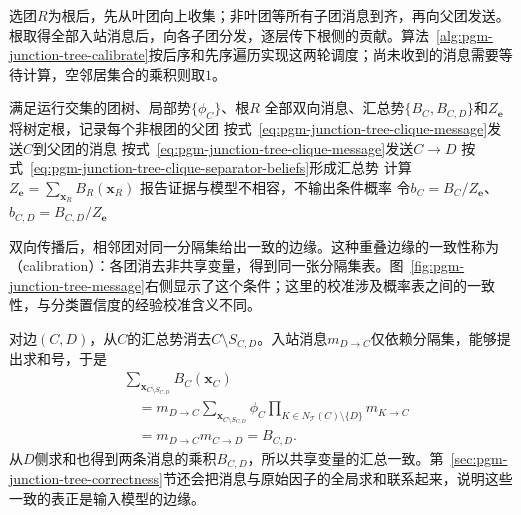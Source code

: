 选团$R$为根后，先从叶团向上收集；非叶团等所有子团消息到齐，再向父团发送。根取得全部入站消息后，向各子团分发，逐层传下根侧的贡献。算法~\ref{alg:pgm-junction-tree-calibrate}按后序和先序遍历实现这两轮调度；尚未收到的消息需要等待计算，空邻居集合的乘积则取$1$。

\begin{algorithm}[团树上的和积校准]
  \label{alg:pgm-junction-tree-calibrate}
  \begin{algorithmic}[1]
    \Require 满足运行交集的团树、局部势$\{\phi_C\}$、根$R$
    \Ensure 全部双向消息、汇总势$\{B_C,B_{C,D}\}$和$Z_{\bm{e}}$
    \State 将树定根，记录每个非根团的父团
      \State 按式~\eqref{eq:pgm-junction-tree-clique-message}发送$C$到父团的消息
    \EndFor
        \State 按式~\eqref{eq:pgm-junction-tree-clique-message}发送$C\to D$
      \EndFor
    \EndFor
    \State 按式~\eqref{eq:pgm-junction-tree-clique-separator-beliefs}形成汇总势
    \State 计算$Z_{\bm{e}}=\sum_{\bm{x}_R}B_R(\bm{x}_R)$
      \State 报告证据与模型不相容，不输出条件概率
    \Else
      \State 令$b_C=B_C/Z_{\bm{e}}$、$b_{C,D}=B_{C,D}/Z_{\bm{e}}$
    \EndIf
  \end{algorithmic}
\end{algorithm}

双向传播后，相邻团对同一分隔集给出一致的边缘。这种重叠边缘的一致性称为（calibration）：各团消去非共享变量，得到同一张分隔集表。图~\ref{fig:pgm-junction-tree-message}右侧显示了这个条件；这里的校准涉及概率表之间的一致性，与分类置信度的经验校准含义不同。

对边$(C,D)$，从$C$的汇总势消去$C\setminus S_{C,D}$。入站消息$m_{D\to C}$仅依赖分隔集，能够提出求和号，于是
\begin{equation}
  \begin{aligned}
    &\sum_{\bm{x}_{C\setminus S_{C,D}}}B_C(\bm{x}_C)\\
      &\quad=m_{D\to C}
        \sum_{\bm{x}_{C\setminus S_{C,D}}}
          \phi_C\prod_{K\in N_{\mathcal{T}}(C)\setminus\{D\}}m_{K\to C}\\
      &\quad=m_{D\to C}m_{C\to D}=B_{C,D}.
  \end{aligned}
  \label{eq:pgm-junction-tree-local-calibration}
\end{equation}
从$D$侧求和也得到两条消息的乘积$B_{C,D}$，所以共享变量的汇总一致。第~\ref{sec:pgm-junction-tree-correctness}节还会把消息与原始因子的全局求和联系起来，说明这些一致的表正是输入模型的边缘。

